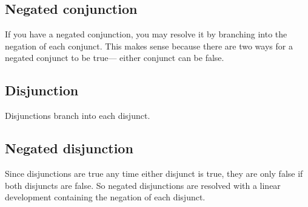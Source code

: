 
\subsection{Negated conjunction}

If you have a negated conjunction, you may resolve it by branching into the negation of each conjunct. This makes sense because there are two ways for a negated conjunct to be true--- either conjunct can be false.


\subsection{Disjunction}
\label{subsec.DisjunctionTreeRule}
\begin{groupitems}
Disjunctions branch into each disjunct.

\end{groupitems}

\subsection{Negated disjunction}

Since disjunctions are true any time either disjunct is true, they are only false if both disjuncts are false. So negated disjunctions are resolved with a linear development containing the negation of each disjunct.


